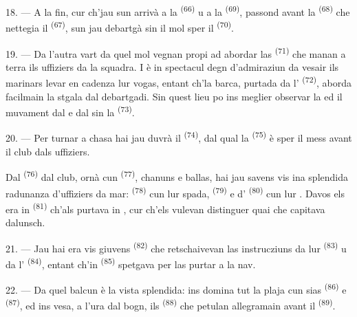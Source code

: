 18. --- A la fin, cur ch'jau sun arrivà a la  \textsuperscript{(66)}
u a la  \textsuperscript{(69)}, passond avant la 
\textsuperscript{(68)} che nettegia il  \textsuperscript{(67)}, sun jau
debartgà sin il mol sper il  \textsuperscript{(70)}.

19. --- Da l'autra vart da quel mol vegnan propi ad abordar las 
\textsuperscript{(71)} che manan a terra ils uffiziers da la squadra. I è in spectacul
degn d'admiraziun da vesair ils marinars levar en cadenza lur vogas, entant ch'la
barca, purtada da l' \textsuperscript{(72)}, aborda facilmain la stgala dal
debartgadi. Sin quest lieu po ins meglier observar la  ed il muvament dal
 e dal  sin la  \textsuperscript{(73)}.

\VUsaut{3.0mm}
\VUsaut{3.0mm}

20. --- Per turnar a chasa hai jau duvrà il  \textsuperscript{(74)},
dal qual la  \textsuperscript{(75)} è sper il  mess avant il club
dals uffiziers.

Dal  \textsuperscript{(76)} dal club, ornà cun 
\textsuperscript{(77)}, chanuns e ballas, hai jau savens vis ina splendida radunanza
d'uffiziers da mar:  \textsuperscript{(78)} cun lur spada,
 \textsuperscript{(79)} e d'
\textsuperscript{(80)} cun lur . Davos els era in 
\textsuperscript{(81)} ch'als purtava in , cur ch'els vulevan
distinguer quai che capitava dalunsch.

21. --- Jau hai era vis giuvens  \textsuperscript{(82)} che
retschaivevan las instrucziuns da lur  \textsuperscript{(83)} u da
l' \textsuperscript{(84)}, entant ch'in 
\textsuperscript{(85)} spetgava per las purtar a la nav.

22. --- Da quel balcun è la vista splendida: ins domina tut la plaja cun sias
 \textsuperscript{(86)} e  \textsuperscript{(87)}, ed ins
vesa, a l'ura dal bogn, ils  \textsuperscript{(88)} che petulan
allegramain avant il  \textsuperscript{(89)}.

